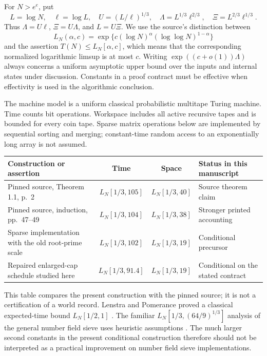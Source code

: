 For $N>e^e$, put
\begin{equation}
 L=\log N,\quad \ell=\log L,\quad
 U=(L/\ell)^{1/3},\quad
 \Lambda=L^{1/3}\ell^{2/3},\quad
 \Xi=L^{2/3}\ell^{1/3}.
 \label{rf:scales}
\end{equation}
Thus $\Lambda=U\ell$, $\Xi=U\Lambda$, and $L=U\Xi$.
We use the source's distinction between
\[
 L_N(\alpha,c)=\exp\{c(\log N)^\alpha
                         (\log\log N)^{1-\alpha}\}
\]
and the assertion $T(N)\le L_N[\alpha,c]$, which means that the
corresponding normalized logarithmic limsup is at most $c$.
Writing $\exp((c+o(1))\Lambda)$ always concerns a uniform asymptotic
upper bound over the inputs and internal states under discussion.
Constants in a proof contract must be effective when effectivity is
used in the algorithmic conclusion.

The machine model is a uniform classical probabilistic multitape
Turing machine.  Time counts bit operations.  Workspace includes all
active recursive tapes and is bounded for every coin tape.  Sparse
matrix operations below are implemented by sequential sorting and
merging; constant-time random access to an exponentially long array
is not assumed.

\begin{center}
\begin{tabular}{p{}ccp{}}
\toprule
Construction or assertion & Time & Space & Status in this manuscript\\
\midrule
Pinned source, Theorem 1.1, p.~2
 & $L_N[1/3,105]$ & $L_N[1/3,40]$ & Source theorem claim\\
Pinned source, induction, pp.~47--49
 & $L_N[1/3,104]$ & $L_N[1/3,38]$ & Stronger printed accounting\\
Sparse implementation with the old root-prime scale
 & $L_N[1/3,102]$ & $L_N[1/3,19]$ & Conditional precursor\\
Repaired enlarged-cap schedule studied here
 & $L_N[1/3,91.4]$ & $L_N[1/3,19]$ & Conditional on the stated contract\\
\bottomrule
\end{tabular}
\end{center}

This table compares the present construction with the pinned source;
it is not a certification of a world record.  Lenstra and Pomerance
proved a classical expected-time bound $L_N[1/2,1]$
\cite{LenstraPomerance1992}.  The familiar
$L_N[1/3,(64/9)^{1/3}]$ analysis of the general number field sieve uses
heuristic assumptions \cite{GNFS1993}.  The much larger second
constants in the present conditional construction therefore should
not be interpreted as a practical improvement on number field sieve
implementations.

